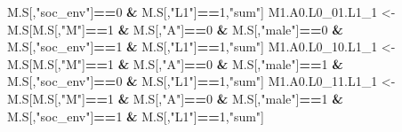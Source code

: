 \documentclass[
]{book}
\newenvironment{Shaded}{\begin{snugshade}}{\end{snugshade}}
\newcommand{\DecValTok}[1]{\textcolor[rgb]{0.00,0.00,0.81}{#1}}
\newcommand{\NormalTok}[1]{#1}
\newcommand{\OtherTok}[1]{\textcolor[rgb]{0.56,0.35,0.01}{#1}}
\newcommand{\SpecialCharTok}[1]{\textcolor[rgb]{0.81,0.36,0.00}{\textbf{#1}}}
\newcommand{\StringTok}[1]{\textcolor[rgb]{0.31,0.60,0.02}{#1}}
\begin{document}
\begin{Shaded}
\begin{Highlighting}[]
\NormalTok{                            M.S[,}\StringTok{"soc\_env"}\NormalTok{]}\SpecialCharTok{==}\DecValTok{0} \SpecialCharTok{\&}\NormalTok{ M.S[,}\StringTok{"L1"}\NormalTok{]}\SpecialCharTok{==}\DecValTok{1}\NormalTok{,}\StringTok{"sum"}\NormalTok{]}
\NormalTok{  M1.A0.L0\_01.L1\_1 }\OtherTok{\textless{}{-}}\NormalTok{ M.S[M.S[,}\StringTok{"M"}\NormalTok{]}\SpecialCharTok{==}\DecValTok{1} \SpecialCharTok{\&}\NormalTok{ M.S[,}\StringTok{"A"}\NormalTok{]}\SpecialCharTok{==}\DecValTok{0} \SpecialCharTok{\&}\NormalTok{ M.S[,}\StringTok{"male"}\NormalTok{]}\SpecialCharTok{==}\DecValTok{0} \SpecialCharTok{\&} 
\NormalTok{                            M.S[,}\StringTok{"soc\_env"}\NormalTok{]}\SpecialCharTok{==}\DecValTok{1} \SpecialCharTok{\&}\NormalTok{ M.S[,}\StringTok{"L1"}\NormalTok{]}\SpecialCharTok{==}\DecValTok{1}\NormalTok{,}\StringTok{"sum"}\NormalTok{]}
\NormalTok{  M1.A0.L0\_10.L1\_1 }\OtherTok{\textless{}{-}}\NormalTok{ M.S[M.S[,}\StringTok{"M"}\NormalTok{]}\SpecialCharTok{==}\DecValTok{1} \SpecialCharTok{\&}\NormalTok{ M.S[,}\StringTok{"A"}\NormalTok{]}\SpecialCharTok{==}\DecValTok{0} \SpecialCharTok{\&}\NormalTok{ M.S[,}\StringTok{"male"}\NormalTok{]}\SpecialCharTok{==}\DecValTok{1} \SpecialCharTok{\&} 
\NormalTok{                            M.S[,}\StringTok{"soc\_env"}\NormalTok{]}\SpecialCharTok{==}\DecValTok{0} \SpecialCharTok{\&}\NormalTok{ M.S[,}\StringTok{"L1"}\NormalTok{]}\SpecialCharTok{==}\DecValTok{1}\NormalTok{,}\StringTok{"sum"}\NormalTok{]}
\NormalTok{  M1.A0.L0\_11.L1\_1 }\OtherTok{\textless{}{-}}\NormalTok{ M.S[M.S[,}\StringTok{"M"}\NormalTok{]}\SpecialCharTok{==}\DecValTok{1} \SpecialCharTok{\&}\NormalTok{ M.S[,}\StringTok{"A"}\NormalTok{]}\SpecialCharTok{==}\DecValTok{0} \SpecialCharTok{\&}\NormalTok{ M.S[,}\StringTok{"male"}\NormalTok{]}\SpecialCharTok{==}\DecValTok{1} \SpecialCharTok{\&} 
\NormalTok{                            M.S[,}\StringTok{"soc\_env"}\NormalTok{]}\SpecialCharTok{==}\DecValTok{1} \SpecialCharTok{\&}\NormalTok{ M.S[,}\StringTok{"L1"}\NormalTok{]}\SpecialCharTok{==}\DecValTok{1}\NormalTok{,}\StringTok{"sum"}\NormalTok{]}
  

\end{Highlighting}
\end{Shaded}
\end{document}
